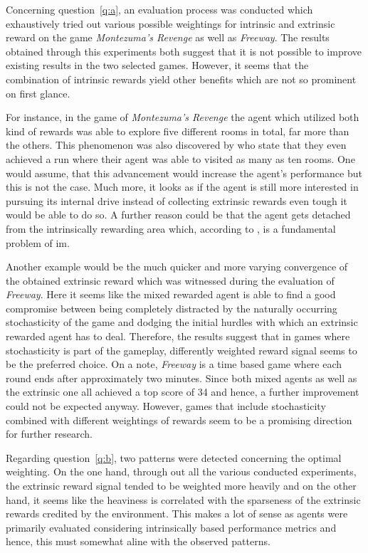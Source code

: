 \documentclass[draft,final]{vutinfth} %
\begin{document}
    Concerning question~\ref{q:a}, an evaluation process was conducted which exhaustively tried out various possible weightings for intrinsic and extrinsic reward on the game \textit{Montezuma's Revenge} as well as \textit{Freeway}.
    The results obtained through this experiments both suggest that it is not possible to improve existing results in the two selected games.
    However, it seems that the combination of intrinsic rewards yield other benefits which are not so prominent on first glance.

    For instance, in the game of \textit{Montezuma's Revenge} the agent which utilized both kind of rewards was able to explore five different rooms in total, far more than the others.
    This phenomenon was also discovered by \citeauthor{burda_large-scale_2018-1} who state that they even achieved a run where their agent was able to visited as many as ten rooms.
    One would assume, that this advancement would increase the agent's performance but this is not the case.
    Much more, it looks as if the agent is still more interested in pursuing its internal drive instead of collecting extrinsic rewards even tough it would be able to do so.
    A further reason could be that the agent gets detached from the intrinsically rewarding area which, according to \citet{ecoffet_go-explore_2019}, is a fundamental problem of \gls{im}.

    Another example would be the much quicker and more varying convergence of the obtained extrinsic reward which was witnessed during the evaluation of \textit{Freeway}.
    Here it seems like the mixed rewarded agent is able to find a good compromise between being completely distracted by the naturally occurring stochasticity of the game and dodging the initial hurdles with which an extrinsic rewarded agent has to deal.
    Therefore, the results suggest that in games where stochasticity is part of the gameplay, differently weighted reward signal seems to be the preferred choice.
    On a note, \textit{Freeway} is a time based game where each round ends after approximately two minutes.
    Since both mixed agents as well as the extrinsic one all achieved a top score of 34 and hence, a further improvement could not be expected anyway.
    However, games that include stochasticity combined with different weightings of rewards seem to be a promising direction for further research.

    Regarding question~\ref{q:b}, two patterns were detected concerning the optimal weighting.
    On the one hand, through out all the various conducted experiments, the extrinsic reward signal tended to be weighted more heavily and on the other hand, it seems like the heaviness is correlated with the sparseness of the extrinsic rewards credited by the environment.
    This makes a lot of sense as agents were primarily evaluated considering intrinsically based performance metrics and hence, this must somewhat aline with the observed patterns.
\end{document}
